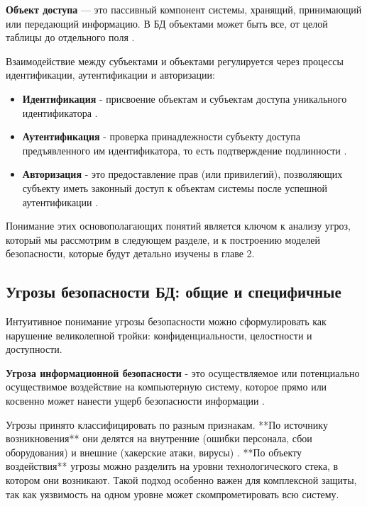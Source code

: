 \textbf{Объект доступа} — это пассивный компонент системы, хранящий, принимающий или передающий информацию. В БД объектами может быть все, от целой таблицы до отдельного поля \autocite[сс. 15-18]{Skakun}.

Взаимодействие между субъектами и объектами регулируется через процессы идентификации, аутентификации и авторизации:
\begin{itemize}
    \item \textbf{Идентификация} - присвоение объектам и субъектам доступа уникального идентификатора \autocite[сс. 15-18]{Skakun}.
    \item \textbf{Аутентификация}  - проверка принадлежности субъекту доступа предъявленного им идентификатора, то есть подтверждение подлинности \autocite[сс. 15-18]{Skakun}.
    \item \textbf{Авторизация} - это предоставление прав (или привилегий), позволяющих субъекту иметь законный доступ к объектам системы после успешной аутентификации \autocite[сс. 15-18]{Skakun}.
\end{itemize}

Понимание этих основополагающих понятий является ключом к анализу угроз, который мы рассмотрим в следующем разделе, и к построению моделей безопасности, которые будут детально изучены в главе 2.

\subsection{Угрозы безопасности БД: общие и специфичные}
Интуитивное понимание угрозы безопасности можно сформулировать как нарушение великолепной тройки: конфиденциальности, целостности и доступности. 
\begin{grayquote}
\textbf{Угроза информационной безопасности} - это осуществляемое или потенциально осуществимое воздействие на компьютерную систему, которое прямо или косвенно может нанести ущерб безопасности информации \autocite[с. 19]{Skakun}.
\end{grayquote}
Угрозы принято классифицировать по разным признакам. **По источнику возникновения** они делятся на внутренние (ошибки персонала, сбои оборудования) и внешние (хакерские атаки, вирусы) \autocite{Ytebov2008}. **По объекту воздействия** угрозы можно разделить на уровни технологического стека, в котором они возникают. Такой подход особенно важен для комплексной защиты, так как уязвимость на одном уровне может скомпрометировать всю систему.

